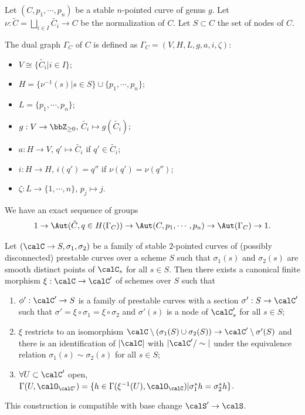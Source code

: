   Let $(C,p_1,\cdots,p_n)$ be a stable $n$-pointed curve of genus $g$.
  Let $\nu: \tilde{C} = \bigsqcup_{i \in I} \tilde{C_i} \to C$ be the normalization of $C$.
  Let $S \subset C$ the set of nodes of $C$.

  \begin{definition}
    The dual graph $\Gamma_C$ of $C$ is defined as $\Gamma_C = (V,H,L,g,a,i,\zeta)$:
    \begin{itemize}
      \item $V \cong \{\tilde{C_i} | i \in I\}$;
      \item $H = \{\nu^{-1}(s) | s \in S\} \cup \{p_1,\cdots,p_n\}$;
      \item $L = \{p_1,\cdots,p_n\}$;
      \item $g: V \to \bbZ_{\geq 0}$, $\tilde{C_i} \mapsto g(\tilde{C_i})$;
      \item $a: H \to V$, $q' \mapsto \tilde{C_i}$ if $q' \in \tilde{C_i}$;
      \item $i:H \to H$, $i(q') = q''$ if $\nu(q') = \nu(q'')$;
      \item $\zeta: L \to \{1,\cdots,n\}$, $p_j \mapsto j$.
    \end{itemize}
  \end{definition}

  \begin{remark}
    We have an exact sequence of groups
    \[ 1 \to \Aut(\tilde{C},q \in H(\Gamma_C)) \to \Aut(C,p_1,\cdots,p_n) \to \Aut(\Gamma_C) \to 1. \]
  \end{remark}

  \begin{theorem}
    Let $(\calC \to S, \sigma_1,\sigma_2)$ be a family of stable $2$-pointed curves of (possibly disconnected) prestable curves over a scheme $S$ 
    such that $\sigma_1(s)$ and $\sigma_2(s)$ are smooth distinct points of $\calC_s$ for all $s \in S$.
    Then there exists a canonical finite morphism $\xi: \calC \to \calC'$ of schemes over $S$ such that
    \begin{enumerate}[label=(\arabic*)]
      \item $\phi': \calC' \to S$ is a family of prestable curves with a section $\sigma': S \to \calC'$ such that $\sigma' = \xi \circ \sigma_1 = \xi \circ \sigma_2$ and $\sigma'(s)$ is a node of $\calC'_s$ for all $s \in S$;
      \item $\xi$ restricts to an isomorphism $\calC \setminus (\sigma_1(S) \cup \sigma_2(S)) \to \calC' \setminus \sigma'(S)$ and there is an identification of $|\calC|$ with $|\calC'/\sim|$ under the equivalence relation $\sigma_1(s) \sim \sigma_2(s)$ for all $s \in S$;
      \item $\forall U \subset \calC'$ open, $\Gamma(U, \calO_{\calC'}) = \{h \in \Gamma(\xi^{-1}(U), \calO_\calC) | \sigma_1^*h = \sigma_2^*h\}$.
    \end{enumerate}
    This construction is compatible with base change $\calS' \to \calS$.
  \end{theorem}


